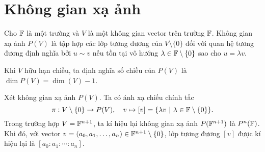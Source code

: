 \section{Không gian xạ ảnh}

\begin{defn}
    Cho $\mathbb{F}$ là một trường và $V$ là một không gian vector trên trường $\mathbb{F}$. Không gian xạ ảnh $P(V)$ là tập hợp các lớp tương đương của $V\setminus \{0\}$ đối với quan hệ tương đương định nghĩa bởi $u \sim v$ nếu tồn tại vô hướng $\lambda \in \mathbb{F}\setminus\{0\}$ sao cho $u = \lambda v$.

    Khi $V$ hữu hạn chiều, ta định nghĩa số chiều của $P(V)$ là $\dim P(V) = \dim(V) -1$.
\end{defn}
Xét không gian xạ ảnh $P(V)$. Ta có ánh xạ chiếu chính tắc
\[\pi: V\setminus\{0\} \to P(V),\quad v \mapsto [v]=\{\lambda v~|~\lambda \in \mathbb{F}\setminus\{0\}\}.\]
Trong trường hợp $V = \mathbb{F}^{n+1}$, ta kí hiệu lại không gian xạ ảnh $P(\mathbb{F}^{n+1})$ là $P^{n}(\mathbb{F})$. Khi đó, với vector $v=(a_0,a_1,\ldots,a_n) \in \mathbb{F}^{n+1}\setminus\{0\}$, lớp tương đương $[v]$ được kí hiệu lại là $[a_0:a_1:\cdots:a_n]$.

